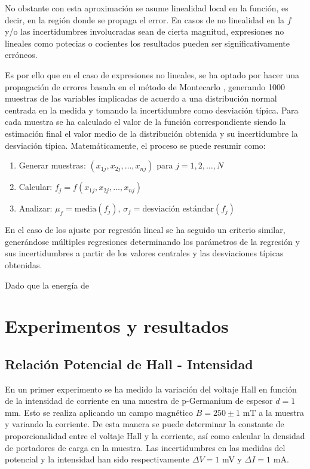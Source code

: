 	\vspace{\baselineskip}
	
	No obstante con esta aproximación se asume linealidad local en la función, es decir, en la región donde se propaga el error. En casos de no linealidad en la $f$ y/o las incertidumbres involucradas sean de cierta magnitud, expresiones no lineales como potecias o cocientes los resultados pueden ser significativamente erróneos.
	
	\clearpage	
	
	Es por ello  que en el  caso de expresiones no lineales, se ha optado por hacer una propagación de errores basada en el método de Montecarlo \cite{Anderson_montecarlo_1}, generando 1000 muestras de las variables implicadas de acuerdo a una distribución normal centrada en la medida y tomando la incertidumbre como desviación típica.  Para cada muestra se ha calculado el valor de la función correspondiente siendo la estimación final el valor medio de la distribución obtenida y su incertidumbre la desviación típica. Matemáticamente, el proceso se puede resumir como:
	
	\begin{enumerate}
		\item Generar muestras: \((x_{1j}, x_{2j}, \ldots, x_{nj})\) para \(j = 1, 2, \ldots, N\)
		\item Calcular: \(f_j = f(x_{1j}, x_{2j}, \ldots, x_{nj})\)
		\item Analizar: \(\mu_f = \text{media}(f_j)\), \(\sigma_f = \text{desviación estándar}(f_j)\)
	\end{enumerate}
	
	En el caso de los ajuste por regresión lineal se ha seguido un criterio similar, generándose múltiples regresiones determinando los parámetros de la regresión y sus incertidumbres a partir de los valores centrales y las desviaciones típicas obtenidas.
	
	Dado que la energía de 
	
	
	\section{Experimentos y resultados}	
	
	\subsection{Relación Potencial de Hall - Intensidad}	

	En un primer experimento se ha medido la variación del voltaje Hall en función de la intensidad de corriente en una muestra de p-Germanium de espesor $d=1$ mm. Esto se realiza aplicando un campo magnético $B= 250\pm 1 \text{ mT}$ a la muestra  y variando la corriente. De esta manera se puede determinar la constante de proporcionalidad entre el voltaje Hall y la corriente, así como calcular la densidad de portadores de carga en la muestra. Las incertidumbres en las  medidas del potencial y la intensidad han sido respectivamente $\Delta V = 1$ mV y  $\Delta I = 1$ mA.
	
